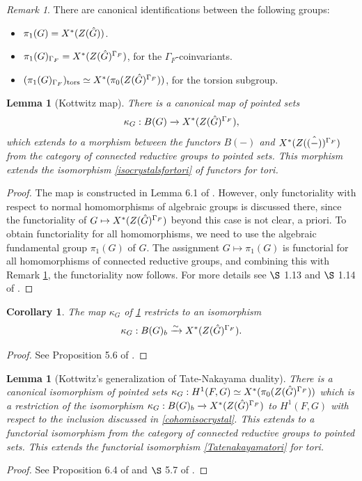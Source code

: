 \documentclass[11pt,a4paper]{article}
\theoremstyle{definition}
\theoremstyle{plain}
\newtheorem{Le}[shared]{Lemma}
\newtheorem{C}[shared]{Corollary}
\theoremstyle{remark}
\newtheorem{R}[shared]{Remark}
\theoremstyle{plain}
\begin{document}
\begin{R}\label{observation}
    There are canonical identifications between the following groups:  
    \begin{itemize}
        \item $\pi_1(G) = X^*(Z(\Hat{G}))$.
        \item $\pi_1(G)_{\Gamma_F} = X^*(Z(\Hat{G})^{\Gamma_F})$, for the $\Gamma_F$-coinvariants.
        \item $(\pi_1(G)_{\Gamma_F})_{\text{tors}} \simeq X^*(\pi_0(Z(\Hat{G})^{\Gamma_F}))$, for the torsion subgroup.
    \end{itemize}
\end{R}

\begin{Le}[Kottwitz map]\label{kottwitzmap}
    There is a canonical map of pointed sets
    $$\kappa_G: B(G) \xrightarrow[]{} X^*(Z(\Hat{G})^{\Gamma_F}),$$
    which extends to a morphism between the functors $B(-)$ and $X^*(Z(\Hat{(-)})^{\Gamma_F})$ from the category of connected reductive groups to pointed sets. This morphism extends the isomorphism \ref{isocrystalsfortori} of functors for tori.
\end{Le}
\begin{proof}
    The map is constructed in Lemma 6.1 of \cite{MR1044820}. However, only functoriality with respect to normal homomorphisms of algebraic groups is discussed there, since the functoriality of $G \mapsto X^*(Z(\Hat{G})^{\Gamma_F})$ beyond this case is not clear, a priori. To obtain functoriality for all homomorphisms, we need to use the algebraic fundamental group $\pi_1(G)$ of $G$. The assignment $G \mapsto \pi_1(G)$ is functorial for all homomorphisms of connected reductive groups, and combining this with Remark \ref{observation}, the functoriality now follows. For more details see $\S$ 1.13 and $\S$ 1.14 of \cite{MR1411570}.
\end{proof}

\begin{C}\label{classificationofbasic}
    The map $\kappa_G$ of \ref{kottwitzmap} restricts to an isomorphism
    $$\kappa_G: B(G)_b \xrightarrow[]{\sim} X^*(Z(\Hat{G})^{\Gamma_F}).$$
\end{C}
\begin{proof}
    See Proposition 5.6 of \cite{MR809866}.
\end{proof}

\begin{Le}[Kottwitz's generalization of Tate-Nakayama duality]\label{KottwitzTateNakayama}
    There is a canonical isomorphism of pointed sets $\kappa_G: H^1(F,G) \simeq X^*(\pi_0(Z(\Hat{G})^{\Gamma_F}))$ which is a restriction of the isomorphism $\kappa_G: B(G)_b \xrightarrow[]{} X^*(Z(\Hat{G})^{\Gamma_F})$ to $H^1(F,G)$ with respect to the inclusion discussed in \ref{cohomisocrystal}. This extends to a functorial isomorphism from the category of connected reductive groups to pointed sets. This extends the functorial isomorphism \ref{Tatenakayamatori} for tori.
\end{Le}
\begin{proof}
    See Proposition 6.4 of \cite{MR0757954} and $\S$ 5.7 of \cite{MR809866}.
\end{proof}
\end{document}
